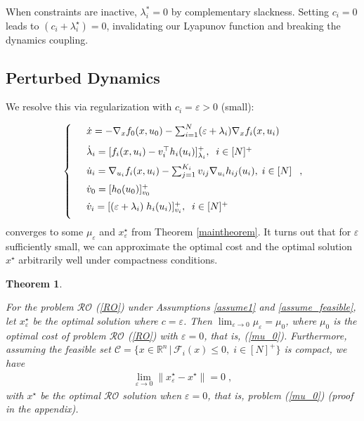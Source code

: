 \documentclass[journal,twoside,web]{ieeecolor}
\newcommand{\rev}[1]{\textcolor{revisionblue}{#1}}
\newtheorem{theorem}{Theorem}
\begin{document}
When constraints are inactive, $\lambda_i^* = 0$ by complementary slackness. Setting $c_i = 0$ leads to $(c_i+\lambda_i^\star)=0$, invalidating our Lyapunov function and breaking the dynamics coupling.

\subsection*{\rev{Perturbed Dynamics}}

We resolve this via regularization with $c_i=\varepsilon>0$ (small):

\begin{align} \label{pd_dynamics_ep}
\left\{
\begin{array}{cl}
\vspace{3mm}
&\dot x=-\nabla_x f_0(x,u_0)- \sum_{i=1}^N(\varepsilon+\lambda_i) \nabla_x f_i(x,u_i)\\
\vspace{2mm}
&\dot \lambda_i=[f_i(x,u_i)-v_i^\top h_i(u_i)]_{\lambda_i}^+,\;\; i\in[N]^+\\
\vspace{2mm}
&\dot u_i=\nabla_{u_i}f_i(x,u_i)-  \sum_{j=1}^{K_i} v_{ij} \nabla_{u_i} h_{ij}(u_i),\; i\in[N]\\
\vspace{2mm}
&\dot{v}_0=[h_0(u_0)]_{v_0}^+\\
\vspace{2mm}
&\dot v_i=[(\varepsilon+\lambda_i) \; h_i(u_i)]_{v_i}^+,\;\;i\in[N]^+
\end{array}\right.,
\end{align}
converges to some $\mu_{\varepsilon}$ and $x^\star_{\varepsilon}$ from Theorem \ref{maintheorem}. It turns out that for $\varepsilon$ sufficiently small, we can approximate the optimal cost and the optimal solution $x^\star$ arbitrarily well under compactness conditions.

\begin{theorem} \label{RO_ROperturbed}

For the problem $\mathcal{RO}$ (\ref{RO}) under Assumptions \ref{assume1} and \ref{assume_feasible}, let $x^\star_\varepsilon$ be the optimal solution where $c=\varepsilon$. Then
$\displaystyle\lim_{\varepsilon \to 0}\mu_\varepsilon=\mu_0$, where $\mu_0$ is the optimal cost of problem $\mathcal{RO}$ (\ref{RO}) with $\varepsilon=0$, that is, (\ref{mu_0}). Furthermore, assuming the feasible set $\mathcal{C}=\{x\in \mathbb{R}^n\,|\,\mathcal{F}_i(x)\leq 0,\; i\in[N]^+\}$ is compact, we have
\begin{align*}
\displaystyle\lim_{\varepsilon \to 0} \parallel x_\varepsilon^\star-x^\star \parallel=0\;,
\end{align*}
with $x^\star$ be the optimal $\mathcal{RO}$ solution when $\varepsilon=0$, that is, problem (\ref{mu_0}) (proof in the appendix).
\end{theorem}
\end{document}
